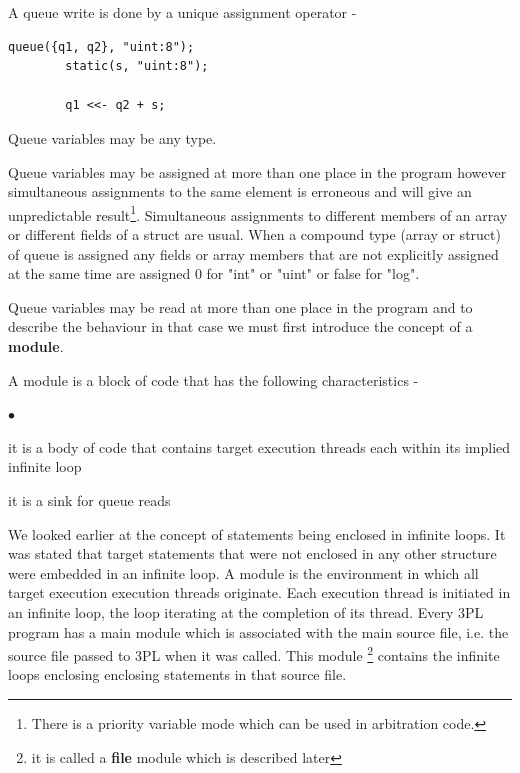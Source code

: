 \documentclass[10pt,a4paper,twoside,fleqn]{article}
\newcommand{\blist}{\begin{list}{$\bullet$}{\setlength{\itemsep}{-5pt}\setlength{\topsep}{-5pt}}}
\newcommand{\blend}{\end{list}}
\newcommand{\kwd}[1]{{\bf #1}} %
\begin{document}
    A queue write is done by a unique assignment operator -
    \begin{lstlisting}[language=threepl]
        queue({q1, q2}, "uint:8");
        static(s, "uint:8");
        
        q1 <<- q2 + s;
    \end{lstlisting}
    
    Queue variables may be any type.
    
    Queue variables may be assigned at more than one place in the program
    however simultaneous assignments to the same element is erroneous and will
    give an unpredictable result\footnote{There is a priority variable mode
    which can be used in arbitration code.}.
    Simultaneous assignments to different members
    of an array or different fields of a struct are usual. When a compound type
    (array or struct) of queue is assigned any fields or array members that are
    not explicitly assigned at the same time are assigned 0 for "int" or "uint"
    or false for "log".
    
    Queue variables may be read at more than one place in the program and to
    describe the behaviour in that case we must first introduce the concept of a
    \kwd{module}.
    
    A module is a block of code that has the following characteristics -
    \blist
    \item   it is a body of code that contains target execution threads
            each within its implied infinite loop
    \item   it is a sink for queue reads
    \blend
    
    We looked earlier at the concept of statements being enclosed in infinite
    loops. It was stated that target statements that were not enclosed in any other
    structure were embedded in an infinite loop. A module is the environment in
    which all target execution execution threads originate. Each execution thread
    is initiated in an infinite loop, the loop iterating at the completion of its
    thread. Every 3PL program has a main module which is associated with the main
    source file, i.e. the source file passed to 3PL when it was called. This module
    \footnote{it is called a \kwd{file} module which is described later} contains the
    infinite loops enclosing enclosing statements in that source file.
    
\end{document}
